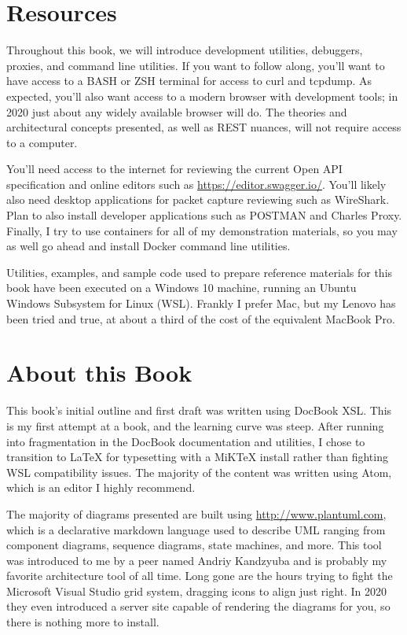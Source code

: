\section*{Resources}

Throughout this book, we will introduce development utilities, debuggers, proxies, and command line utilities.  If you want to follow along, you'll want to have access to a BASH or ZSH terminal for access to curl and tcpdump.  As expected, you'll also want access to a modern browser with development tools; in 2020 just about any widely available browser will do.  The theories and architectural concepts presented, as well as REST nuances, will not require access to a computer.

You'll need access to the internet for reviewing the current Open API specification and online editors such as \url{https://editor.swagger.io/}.  You'll likely also need desktop applications for packet capture reviewing such as WireShark.  Plan to also install developer applications such as POSTMAN and Charles Proxy.  Finally, I try to use containers for all of my demonstration materials, so you may as well go ahead and install Docker command line utilities.

Utilities, examples, and sample code used to prepare reference materials for this book have been executed on a Windows 10 machine, running an Ubuntu Windows Subsystem for Linux (WSL).  Frankly I prefer Mac, but my Lenovo has been tried and true, at about a third of the cost of the equivalent MacBook Pro.

\section*{About this Book}
This book's initial outline and first draft was written using DocBook XSL.  This is my first attempt at a book, and the learning curve was steep.  After running into fragmentation in the DocBook documentation and utilities, I chose to transition to LaTeX for typesetting with a MiKTeX install rather than fighting WSL compatibility issues.  The majority of the content was written using Atom, which is an editor I highly recommend.

The majority of diagrams presented are built using \url{http://www.plantuml.com}, which is a declarative markdown language used to describe UML ranging from component diagrams, sequence diagrams, state machines, and more.  This tool was introduced to me by a peer named Andriy Kandzyuba and is probably my favorite architecture tool of all time.  Long gone are the hours trying to fight the Microsoft Visual Studio grid system, dragging icons to align just right.  In 2020 they even introduced a server site capable of rendering the diagrams for you, so there is nothing more to install.

